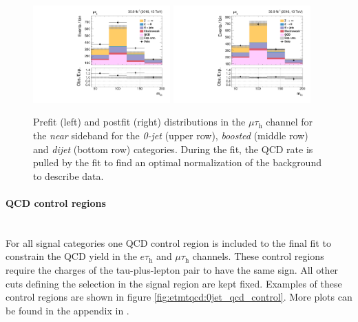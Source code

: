 \begin{figure}[h!]
  {\includegraphics[width=0.47\textwidth]{Figures/background_estimation/RQCDOSSS/Postfit/mt_dijet2D_antiiso_near/prefit_mt_dijet2D_antiiso_near.pdf}}
  {\includegraphics[width=0.47\textwidth]{Figures/background_estimation/RQCDOSSS/Postfit/mt_dijet2D_antiiso_near/postfit_mt_dijet2D_antiiso_near.pdf}}   
 \caption[Prefit and Postfit distributions in the $\mu\tau_\text{h}$ channel for the \textit{near} sideband.]{Prefit (left) and postfit (right) distributions in the $\mu\tau_\text{h}$ channel for the \textit{near} sideband for the \textit{0-jet} (upper row), \textit{boosted} (middle row) and \textit{dijet} (bottom row) categories.
 During the fit, the QCD rate is pulled by the fit to find an optimal normalization of the background to describe data.}\label{fig:etmtqcd:mt_prefitpostfit_near}
\end{figure}

\clearpage

 \paragraph{QCD control regions}\mbox{}\\
 For all signal categories one QCD control region is included to the final fit to constrain the QCD yield in the $e\tau_\text{h}$ and $\mu\tau_\text{h}$ channels.
 These control regions require the charges of the tau-plus-lepton pair to have the same sign. All other cuts defining the selection in the signal region are kept fixed. 
 Examples of these control regions are shown in figure \ref{fig:etmtqcd:0jet_qcd_control}. More plots can be found in the appendix in .

